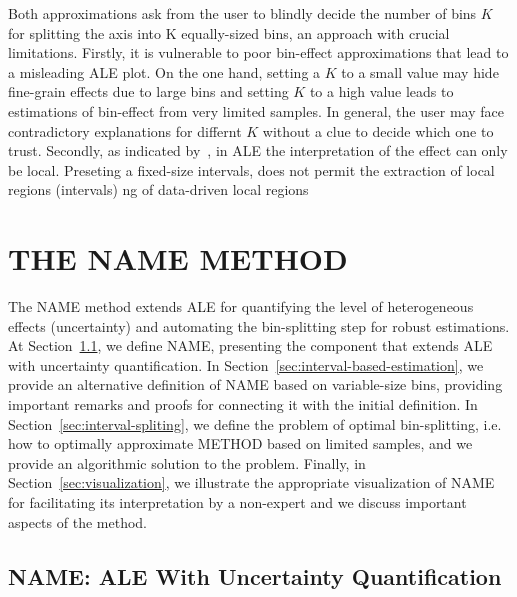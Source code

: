 \documentclass[twoside]{article}
\begin{document}
Both approximations ask from the user to blindly decide the number of
bins \(K\) for splitting the axis into K equally-sized bins, an
approach with crucial limitations. Firstly, it is vulnerable to poor
bin-effect approximations that lead to a misleading ALE plot. On the
one hand, setting a \(K\) to a small value may hide fine-grain effects
due to large bins and setting \(K\) to a high value leads to
estimations of bin-effect from very limited samples. In general, the
user may face contradictory explanations for differnt \(K\) without a
clue to decide which one to trust. Secondly, as indicated
by~\citep{molnar2022}, in ALE the interpretation of the effect can
only be local. Preseting a fixed-size intervals, does not permit the
extraction of local regions (intervals) ng of data-driven local
regions

\section{THE NAME METHOD}
\label{sec:NAME-method}

The NAME method extends ALE for quantifying the level of heterogeneous
effects (uncertainty) and automating the bin-splitting step for robust
estimations. At Section~\ref{sec:NAME-definition}, we define NAME,
presenting the component that extends ALE with uncertainty
quantification. In Section~\ref{sec:interval-based-estimation}, we
provide an alternative definition of NAME based on variable-size bins,
providing important remarks and proofs for connecting it with the
initial definition. In Section~\ref{sec:interval-spliting}, we define
the problem of optimal bin-splitting, i.e. how to optimally
approximate METHOD based on limited samples, and we provide an
algorithmic solution to the problem. Finally, in
Section~\ref{sec:visualization}, we illustrate the appropriate
visualization of NAME for facilitating its interpretation by a
non-expert and we discuss important aspects of the method.


\subsection{NAME: ALE With Uncertainty Quantification}
\label{sec:NAME-definition}
\end{document}
